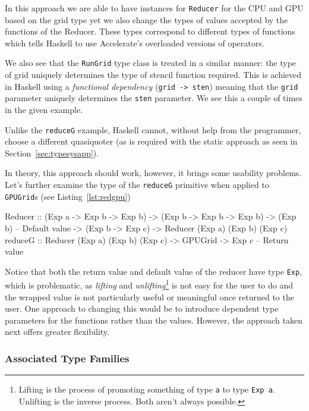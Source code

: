 \documentclass[
    12pt,
    a4paper,
    twoside,
    openright,
    ]{scrbook}
\begin{document}
In this approach we are able to have instances for \texttt{Reducer} for the CPU
and GPU based on the grid type yet we also change the types of values accepted
by the functions of the Reducer. These types correspond to different types of
functions which tells Haskell to use Accelerate's overloaded versions of
operators.

We also see that the \texttt{RunGrid} type class is treated in a similar manner:
the type of grid uniquely determines the type of stencil function required. This
is achieved in Haskell using a \emph{functional dependency} (\texttt{grid ->
  sten}) meaning that the \texttt{grid} parameter uniquely determines the
\texttt{sten} parameter\cite{jones2000}. We see this a couple of times in the
given example.

Unlike the \texttt{reduceG} example, Haskell cannot, without help from the
programmer, choose a different quasiquoter (as is required with the static
approach as seen in Section~\ref{sec:typesysapp}).

In theory, this approach should work, however, it brings some usability
problems. Let's further examine the type of the \texttt{reduceG} primitive
when applied to \texttt{GPUGrid}s (see Listing~\ref{lst:redgpu})

\begin{hflisting}[label={lst:redgpu}, caption={The type of the reducer once the
    Accelerate types are applied.}]
Reducer :: (Exp a -> Exp b -> Exp b)
        -> (Exp b -> Exp b -> Exp b)
        -> (Exp b) -- Default value
        -> (Exp b -> Exp c)
        -> Reducer (Exp a) (Exp b) (Exp c)
reduceG :: Reducer (Exp a) (Exp b) (Exp c)
        -> GPUGrid
        -> Exp c -- Return value
\end{hflisting}

Notice that both the return value and default value of the reducer have type
\texttt{Exp}, which is problematic, as \emph{lifting} and
\emph{unlifting}\footnote{Lifting is the process of promoting something of type
  \texttt{a} to type \texttt{Exp a}. Unlifting is the inverse process. Both
  aren't always possible.}  is not easy for the user to do and the wrapped value
is not particularly useful or meaningful once returned to the user. One approach
to changing this would be to introduce dependent type parameters for the
functions rather than the values. However, the approach taken next offers
greater flexibility.

\subsubsection{Associated Type Families}
\label{sec:assoctypefam}
\end{document}
